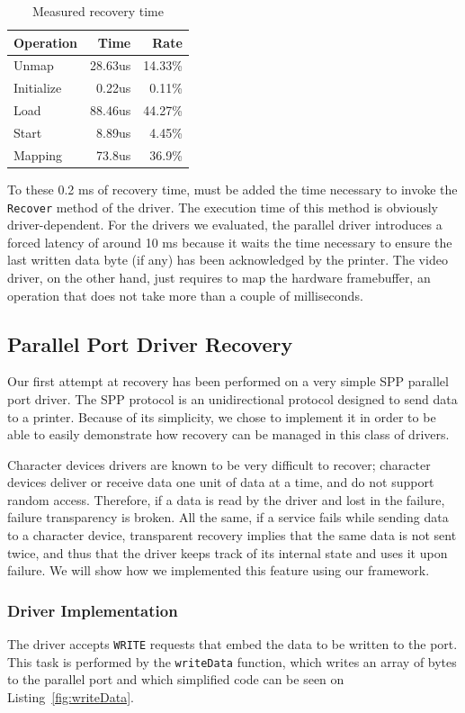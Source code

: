 \documentclass{report}
\begin{document}
\begin{table}[ht]
\centering
\caption{Measured recovery time}
\label{tbl:recovery}
\begin{tabular}{|l|r|r|} \hline
{\bf Operation}&{\bf Time}&{\bf Rate}\\ \hline
Unmap & 28.63us & 14.33\% \\ \hline
Initialize & 0.22us & 0.11\% \\ \hline
Load & 88.46us & 44.27\% \\ \hline
Start &  8.89us & 4.45\% \\ \hline
Mapping & 73.8us & 36.9\%\\ \hline
\end{tabular}
\end{table}

To these 0.2 ms of recovery time, must be added the time necessary to invoke the \texttt{Recover} method of the driver. The execution time of this method is obviously driver-dependent. For the drivers we evaluated, the parallel driver introduces a forced latency of around 10 ms because it waits the time necessary to ensure the last written data byte (if any) has been acknowledged by the printer. The video driver, on the other hand, just requires to map the hardware framebuffer, an operation that does not take more than a couple of milliseconds.


\subsection{Parallel Port Driver Recovery}
Our first attempt at recovery has been performed on a very simple SPP parallel port driver. The SPP protocol is an unidirectional protocol designed to send data to a printer\cite{Peacock2007}. Because of its simplicity, we chose to implement it in order to be able to easily demonstrate how recovery can be managed in this class of drivers.

Character devices drivers are known to be very difficult to recover; character devices deliver or receive data one unit of data at a time, and do not support random access. Therefore, if a data is read by the driver and lost in the failure, failure transparency is broken. All the same, if a service fails while sending data to a character device, transparent recovery implies that the same data is not sent twice, and thus that the driver keeps track of its internal state and uses it upon failure. We will show how we implemented this feature using our framework.

\subsubsection{Driver Implementation}
The driver accepts \texttt{WRITE} requests that embed the data to be written to the port. This task is performed by the \texttt{writeData} function, which writes an array of bytes to the parallel port and which simplified code can be seen on Listing~\ref{fig:writeData}.
\end{document}
